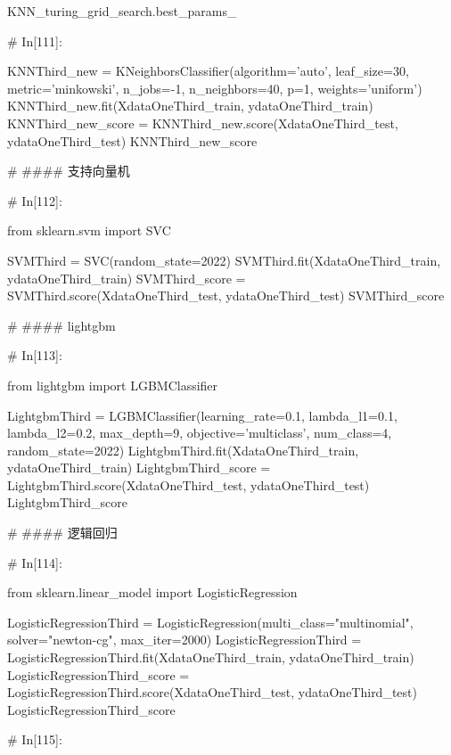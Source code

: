 \documentclass{MathorCupmodeling}
\begin{document}
\begin{python}
	
	KNN_turing_grid_search.best_params_
	
	# In[111]:
	
	
	KNNThird_new = KNeighborsClassifier(algorithm='auto', leaf_size=30,
										metric='minkowski',
										n_jobs=-1,
										n_neighbors=40, p=1,
										weights='uniform')
	KNNThird_new.fit(XdataOneThird_train, ydataOneThird_train)
	KNNThird_new_score = KNNThird_new.score(XdataOneThird_test, ydataOneThird_test)
	KNNThird_new_score
	
	# #### 支持向量机
	
	# In[112]:
	
	
	from sklearn.svm import SVC
	
	SVMThird = SVC(random_state=2022)
	SVMThird.fit(XdataOneThird_train, ydataOneThird_train)
	SVMThird_score = SVMThird.score(XdataOneThird_test, ydataOneThird_test)
	SVMThird_score
	
	# #### lightgbm
	
	# In[113]:
	
	
	from lightgbm import LGBMClassifier
	
	LightgbmThird = LGBMClassifier(learning_rate=0.1,
								   lambda_l1=0.1,
								   lambda_l2=0.2,
								   max_depth=9,
								   objective='multiclass',
								   num_class=4,
								   random_state=2022)
	LightgbmThird.fit(XdataOneThird_train, ydataOneThird_train)
	LightgbmThird_score = LightgbmThird.score(XdataOneThird_test, ydataOneThird_test)
	LightgbmThird_score
	
	# #### 逻辑回归
	
	# In[114]:
	
	
	from sklearn.linear_model import LogisticRegression
	
	LogisticRegressionThird = LogisticRegression(multi_class="multinomial", solver="newton-cg", max_iter=2000)
	LogisticRegressionThird = LogisticRegressionThird.fit(XdataOneThird_train, ydataOneThird_train)
	LogisticRegressionThird_score = LogisticRegressionThird.score(XdataOneThird_test, ydataOneThird_test)
	LogisticRegressionThird_score
	
	# In[115]:
	

\end{python}
\end{document}
